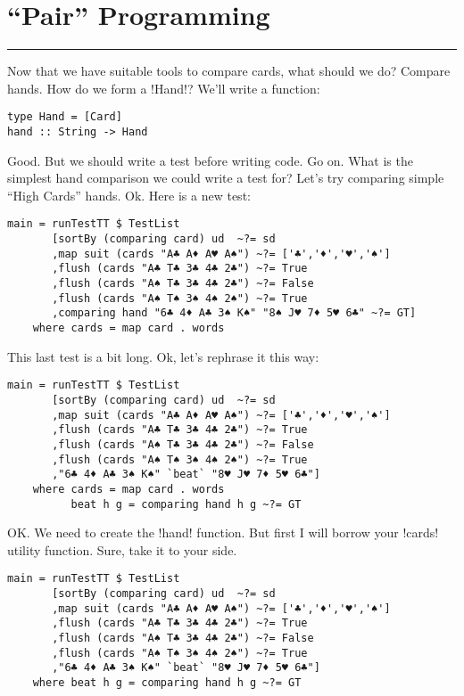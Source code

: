 \newpage
\section{``Pair'' Programming} 
\vspace{10cm}
\hrule

\lhQ Now that we have suitable tools to compare cards, what should we do?
\lhA Compare hands.
\lhN How do we form a \il!Hand!?
\lhA We'll write a function:
\begin{lstlisting}[frame=single]
type Hand = [Card]
hand :: String -> Hand
\end{lstlisting}
\lhN Good. But we should write a test before writing code.
\lhA Go on.
\lhN What is the simplest hand comparison we could write a test for?
\lhA Let's try comparing simple ``High Cards'' hands.
\lhN Ok. Here is a new test:
\begin{lstlisting}[frame=single,escapechar=!]
main = runTestTT $ TestList 
       [sortBy (comparing card) ud  ~?= sd
       ,map suit (cards "A♣ A♦ A♥ A♠") ~?= ['♣','♦','♥','♠']
       ,flush (cards "A♣ T♣ 3♣ 4♣ 2♣") ~?= True
       ,flush (cards "A♠ T♣ 3♣ 4♣ 2♣") ~?= False
       ,flush (cards "A♠ T♠ 3♠ 4♠ 2♠") ~?= True
       ,comparing hand "6♣ 4♦ A♣ 3♠ K♠" "8♠ J♥ 7♦ 5♥ 6♣" ~?= GT]
    where cards = map card . words 
\end{lstlisting} %
\hspace*{\fill}
\lhA This last test is a bit long.
\lhN Ok, let's rephrase it this way:
\begin{lstlisting}[frame=single]
main = runTestTT $ TestList 
       [sortBy (comparing card) ud  ~?= sd
       ,map suit (cards "A♣ A♦ A♥ A♠") ~?= ['♣','♦','♥','♠']
       ,flush (cards "A♣ T♣ 3♣ 4♣ 2♣") ~?= True
       ,flush (cards "A♠ T♣ 3♣ 4♣ 2♣") ~?= False
       ,flush (cards "A♠ T♠ 3♠ 4♠ 2♠") ~?= True
       ,"6♣ 4♦ A♣ 3♠ K♠" `beat` "8♥ J♥ 7♦ 5♥ 6♣"]
    where cards = map card . words 
          beat h g = comparing hand h g ~?= GT
\end{lstlisting} %
\hspace*{\fill}
\lhA \error OK. We need to create the \il!hand! function. But first I will borrow your \il!cards! utility function.
\lhN Sure, take it to your side.
\begin{lstlisting}[frame=single]
main = runTestTT $ TestList 
       [sortBy (comparing card) ud  ~?= sd
       ,map suit (cards "A♣ A♦ A♥ A♠") ~?= ['♣','♦','♥','♠']
       ,flush (cards "A♣ T♣ 3♣ 4♣ 2♣") ~?= True
       ,flush (cards "A♠ T♣ 3♣ 4♣ 2♣") ~?= False
       ,flush (cards "A♠ T♠ 3♠ 4♠ 2♠") ~?= True
       ,"6♣ 4♦ A♣ 3♠ K♠" `beat` "8♥ J♥ 7♦ 5♥ 6♣"]
    where beat h g = comparing hand h g ~?= GT
\end{lstlisting} %
